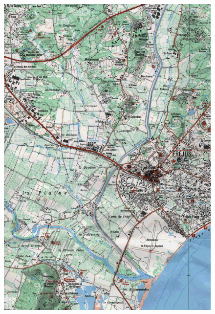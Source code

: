 \documentclass[a4paper,12pt]{article}
\begin{document}
\newpage

\begin{figure}[h]
  \begin{center}
  \includegraphics[scale=0.6]{carte2}
  \caption{}
  \label{fig:carte2}
  \end{center}
  \vfill
\end{figure}

\newpage
\end{document}
